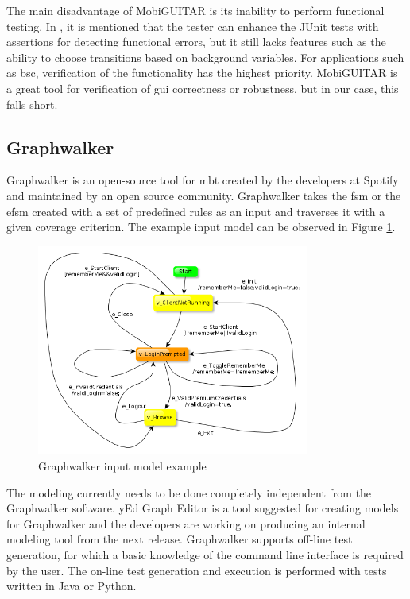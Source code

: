 \par
The main disadvantage of MobiGUITAR is its inability to perform functional testing. In \cite{MobiGUITAR}, it is mentioned that the tester can enhance the JUnit tests with assertions for detecting functional errors, but it still lacks features such as the ability to choose transitions based on background variables. For applications such as \acrshort{bsc}, verification of the functionality has the highest priority. MobiGUITAR is a great tool for verification of \acrshort{gui} correctness or robustness, but in our case, this falls short.

\subsection{Graphwalker}
\par
Graphwalker is an open-source tool for \acrshort{mbt} created by the developers at Spotify \cite{Spotify} and maintained by an open source community. Graphwalker takes the \acrshort{fsm} or the \acrshort{efsm} created with a set of predefined rules as an input and traverses it with a given coverage criterion.
The example input model can be observed in Figure  \ref{Fig:Graphwalker_model_example}.

\begin{figure} [htbp!]
	\centering
					\includegraphics[width=0.8\textwidth]{figures/Graphwalker_model_example.png}
					\caption{\label{Fig:Graphwalker_model_example} Graphwalker input model example \cite{Graphwalker_Login_Example}}
\end{figure}

\par
The modeling currently needs to be done completely independent from the Graphwalker software. yEd Graph Editor \cite{yEd} is a tool suggested for creating models for Graphwalker and the developers are working on producing an internal modeling tool from the next release. Graphwalker supports off-line test generation, for which a basic knowledge of the command line interface is required by the user. The on-line test generation and execution is performed with tests written in Java or Python. 

